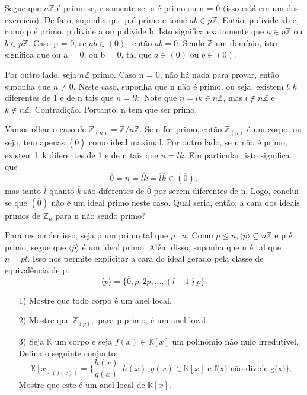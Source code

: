 \documentclass[algebraII_notes.tex]{subfiles}
\begin{document}
\begin{example}
	Segue que \(n \mathbb{Z}\) é primo se, e somente se, n é primo ou n = 0 (isso está em um dos exercício).
	De fato, suponha que p é primo e tome \(ab\in p \mathbb{Z}.\) Então, p divide ab e, como p é primo, p divide a ou p divide b.
	Isto significa exatamente que \(a\in p\mathbb{Z}\) ou \(b\in p \mathbb{Z}.\) Caso p = 0, se \(ab\in (0),\) então
	\(ab=0\). Sendo \(\mathbb{Z}\) um domínio, isto significa que ou a = 0, ou b = 0, tal que \(a\in (0)\) ou \(b\in (0)\).

	Por outro lado, seja \(n \mathbb{Z}\) primo. Caso  n = 0, não há nada para provar, então suponha que \(n\neq 0\).
	Neste caso, suponha que n não é primo, ou seja, existem \(l, k\) diferentes de 1 e de n tais que \(n = lk\). Note que
	\(n = lk\in n\mathbb{Z}\), mas \(l\not\in n \mathbb{Z}\) e \(k\not\in n \mathbb{Z}.\) Contradição. Portanto, n tem que ser primo.
\end{example}
\begin{example}
	Vamos olhar o caso de \(\mathbb{Z}_{(n)} = \mathbb{Z}/n \mathbb{Z}.\) Se n for primo, então \(\mathbb{Z}_{(n)}\) é um corpo, ou seja, tem apenas \((\overline{0})\) como
	ideal maximal. Por outro lado, se n não é primo, existem l, k diferentes de 1 e de n tais que \(n = lk\). Em particular, isto significa que
	\[
		\overline{0} = \overline{n} = \overline{lk} = \overline{l}\overline{k}\in (\overline{0}),
	\]
	mas tanto \(\overline{l}\) quanto \(\overline{k}\) são diferentes de \(\overline{0}\) por serem diferentes de n. Logo, conclui-se que \((\overline{0})\) não é
	um ideal primo neste caso. Qual seria, então, a cara dos ideais primos de \(\mathbb{Z}_{n}\) para n não sendo primo?

	Para responder isso, seja p um primo tal que \(p\mid n\). Como \(p\leq n, \langle \overline{p} \rangle\subseteq n \mathbb{Z}\) e p é primo, segue que
	\(\langle \overline{p} \rangle\) é um ideal primo. Além disso, suponha que n é tal que \(n = pl\). Isso nos permite explicitar a cara do ideal gerado pela classe
	de equivalência de p:
	\[
		\langle \overline{p} \rangle = \{\overline{0}, \overline{p}, 2\overline{p}, \dotsc , (l-1)\overline{p}\}.
	\]
\end{example}
\begin{example}[Exercício]
	\begin{itemize}
		\item[1)] Mostre que todo corpo é um anel local.
		\item[2)] Mostre que \(\mathbb{Z}_{(p)},\) para p primo, é um anel local.
		\item[3)] Seja \(\mathbb{K}\) um corpo e seja \(f(x)\in \mathbb{K}[x]\) um polinômio não nulo irredutível.
		      Defina o seguinte conjunto:
		      \[
			      \mathbb{K}[x]_{(f(x))} = \biggl\{\frac{h(x)}{g(x)}: h(x), g(x)\in \mathbb{K}[x] \text{ e f(x) não divide g(x)}\biggr\}.
		      \]
		      Mostre que este é um anel local de \(\mathbb{K}[x].\)
	\end{itemize}
\end{example}
\end{document}
